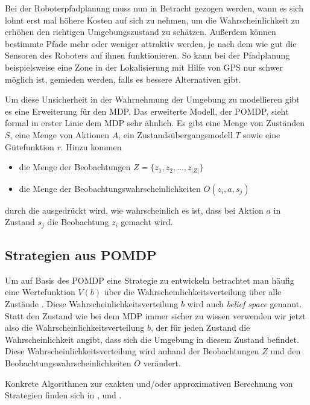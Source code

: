 \documentclass[a4paper]{IEEEtran}
\begin{document}
Bei der Roboterpfadplanung muss nun in Betracht gezogen werden, wann es sich lohnt erst mal höhere Kosten auf sich zu nehmen, um die Wahrscheinlichkeit zu erhöhen den richtigen Umgebungszustand zu schätzen. Außerdem können bestimmte Pfade mehr oder weniger attraktiv werden, je nach dem wie gut die Sensoren des Roboters auf ihnen funktionieren. So kann bei der Pfadplanung beispielsweise eine Zone in der Lokalisierung mit Hilfe von GPS nur schwer möglich ist, gemieden werden, falls es bessere Alternativen gibt.

Um diese Unsicherheit in der Wahrnehmung der Umgebung zu modellieren gibt es eine Erweiterung für den MDP. Das erweiterte Modell, der POMDP, sieht formal in erster Linie dem MDP sehr ähnlich. Es gibt eine Menge von Zuständen $S$, eine Menge von Aktionen $A$, ein Zustandsübergangsmodell $T$ sowie eine Gütefunktion $r$. Hinzu kommen
\begin{itemize}
	\item die Menge der Beobachtungen $Z = \{z_1, z_2, ..., z_{|Z|}\}$
	\item die Menge der Beobachtungswahrscheinlichkeiten $O(z_i, a, s_j)$
\end{itemize}
durch die ausgedrückt wird, wie wahrscheinlich es ist, dass bei Aktion $a$ in Zustand $s_j$ die Beobachtung $z_i$ gemacht wird.

\subsection{Strategien aus POMDP}
Um auf Basis des POMDP eine Strategie zu entwickeln betrachtet man häufig eine Wertefunktion $V(b)$ über die Wahrscheinlichkeitsverteilung über alle Zustände \cite{roy2005finding}. Diese Wahrscheinlichkeitsverteilung $b$ wird auch \emph{belief space} genannt. Statt den Zustand wie bei dem MDP immer sicher zu wissen verwenden wir jetzt also die Wahrscheinlichkeitsverteilung $b$, der für jeden Zustand die Wahrscheinlichkeit angibt, dass sich die Umgebung in diesem Zustand befindet. Diese Wahrscheinlichkeitsverteilung wird anhand der Beobachtungen $Z$ und den Beobachtungswahrscheinlichkeiten $O$ verändert.

Konkrete Algorithmen zur exakten und/oder approximativen Berechnung von Strategien finden sich in \cite{cassandra1995acting}, \cite{roy2005finding} und \cite{thrun2005probabilistic}.
\end{document}
